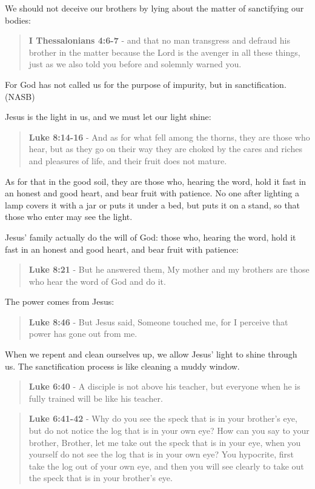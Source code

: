 \documentclass[11pt]{article}
\begin{document}
We should not deceive our brothers by lying about the matter of sanctifying our bodies:

\begin{quote}
\textbf{I Thessalonians 4:6-7} - and that no man transgress and defraud his brother in the matter because the Lord is the avenger in all these things, just as we also told you before and solemnly warned you.
\end{quote}
For God has not called us for the purpose of impurity, but in sanctification. (NASB)

Jesus is the light in us, and we must let our light shine:

\begin{quote}
\textbf{Luke 8:14-16} - And as for what fell among the thorns, they are those who hear, but as they go on their way they are choked by the cares and riches and pleasures of life, and their fruit does not mature.
\end{quote}
As for that in the good soil, they are those who, hearing the word, hold it fast in an honest and good heart, and bear fruit with patience. No one after lighting a lamp covers it with a jar or puts it under a bed, but puts it on a stand, so that those who enter may see the light.

Jesus' family actually do the will of God: those who, hearing the word, hold it fast in an honest and good heart, and bear fruit with patience:

\begin{quote}
\textbf{Luke 8:21} - But he answered them, My mother and my brothers are those who hear the word of God and do it.
\end{quote}

The power comes from Jesus:

\begin{quote}
\textbf{Luke 8:46} - But Jesus said, Someone touched me, for I perceive that power has gone out from me.
\end{quote}

When we repent and clean ourselves up, we allow Jesus' light to shine through us. The sanctification process is like cleaning a muddy window.

\begin{quote}
\textbf{Luke 6:40} - A disciple is not above his teacher, but everyone when he is fully trained will be like his teacher.
\end{quote}

\begin{quote}
\textbf{Luke 6:41-42} - Why do you see the speck that is in your brother's eye, but do not notice the log that is in your own eye? How can you say to your brother, Brother, let me take out the speck that is in your eye, when you yourself do not see the log that is in your own eye? You hypocrite, first take the log out of your own eye, and then you will see clearly to take out the speck that is in your brother's eye.
\end{quote}
\end{document}
